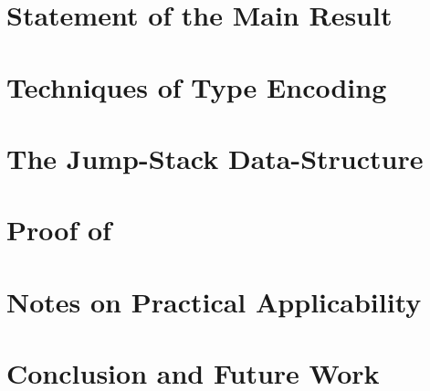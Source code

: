 \documentclass[a4paper,USenglish]{lipics}
\begin{document}
\section{Statement of the Main Result} 
\label{Section:result}


\section{Techniques of Type Encoding}
\label{Section:toolkit}


\section{The Jump-Stack Data-Structure}
\label{Section:jump}


\section{Proof of }
\label{Section:proof}


\section{Notes on Practical Applicability}
\label{Section:applicability}


\section{Conclusion and Future Work}
\label{Section:zz}



\small

\end{document}
